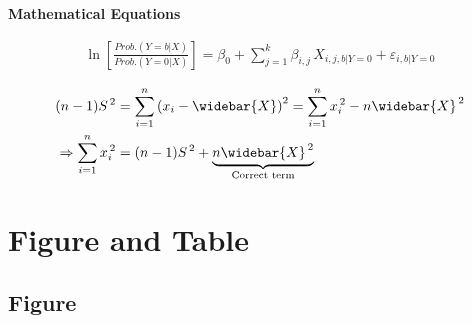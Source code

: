 \documentclass[12pt, aspectratio=169]{beamer}
\begin{document}
\linespread{1} 
\begin{frame}[<+>]{\textbf{Mathematical Equations}}
\linespread{1.5} 
	
	\begin{align}\label{reg}
		\ln\left[\frac{Prob.\left(Y=b|X\right)}{Prob.\left(Y=0|X\right)}\right]
			=\beta_0+\sum_{j=1}^k \beta_{i,j}\,X_{i,j,b|Y=0}+\varepsilon_{i,b|Y=0}
	\end{align}

	\begin{align}\label{var}
		\left(n-1\right)\!S^{\,2} & =  \sum_{i=1}^{n}\left(x_{i}-\widebar{X}\right)^{2} 
			 =  \sum_{i=1}^{n}x_i^{\,2}-n\widebar{X}^{\,2} \notag \\
		\Rightarrow \sum_{i=1}^{n} x_i^{\,2} & =  \left(n-1\right)\!S^{\,2}+\underbrace{n \widebar{X}^{\,2}}_{\text{Correct term}}
	\end{align}

\end{frame}


\section{Figure and Table}


\subsection{Figure}

\end{document}
